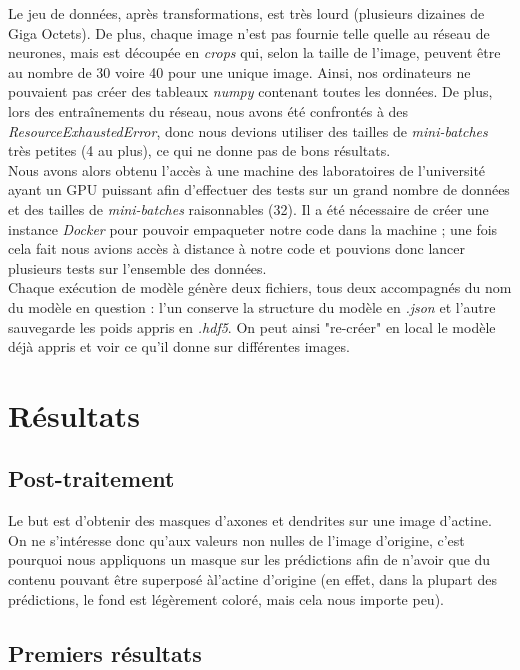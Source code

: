 \documentclass{report}
\begin{document}
Le jeu de données, après transformations, est très lourd (plusieurs dizaines de Giga Octets).
De plus, chaque image n'est pas fournie telle quelle au réseau de neurones, mais
est découpée en \textit{crops} qui, selon la taille de l'image, peuvent être au nombre
de 30 voire 40 pour une unique image. Ainsi, nos ordinateurs ne pouvaient pas
créer des tableaux \textit{numpy} contenant toutes les données. De plus, lors des
entraînements du réseau, nous avons été confrontés à des \textit{ResourceExhaustedError},
donc nous devions utiliser des tailles de \textit{mini-batches} très petites (4 au plus),
ce qui ne donne pas de bons résultats. \\
Nous avons alors obtenu l'accès à une machine des laboratoires de l'université ayant
un GPU puissant afin d'effectuer des tests sur un grand nombre de données et des
tailles de \textit{mini-batches} raisonnables (32). Il a été nécessaire de créer
une instance \textit{Docker} pour pouvoir empaqueter notre code dans la machine ;
une fois cela fait nous avions accès à distance à notre code et pouvions donc
lancer plusieurs tests sur l'ensemble des données. \\
Chaque exécution de modèle génère deux fichiers, tous deux accompagnés du nom du
modèle en question : l'un conserve la structure du modèle en \textit{.json} et
l'autre sauvegarde les poids appris en \textit{.hdf5}. On peut ainsi "re-créer"
en local le modèle déjà appris et voir ce qu'il donne sur différentes images.


\chapter{Résultats}

\section{Post-traitement}

Le but est d'obtenir des masques d'axones et dendrites sur une image d'actine.
On ne s'intéresse donc qu'aux valeurs non nulles de l'image d'origine, c'est
pourquoi nous appliquons un masque sur les prédictions afin de n'avoir que du
contenu pouvant être superposé àl'actine d'origine (en effet, dans la plupart
des prédictions, le fond est légèrement coloré, mais cela nous importe peu).

\section{Premiers résultats}
\end{document}
